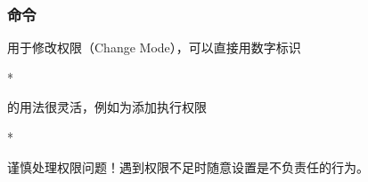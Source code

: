 \begin{frame}
    \frametitle{命令}
    用于修改权限（Change Mode），可以直接用数字标识
    \begin{Code}*
        
    \end{Code}
    的用法很灵活，例如为添加执行权限
    \begin{Code}*
        
    \end{Code}
    谨慎处理权限问题！遇到权限不足时随意设置是不负责任的行为。
\end{frame}



